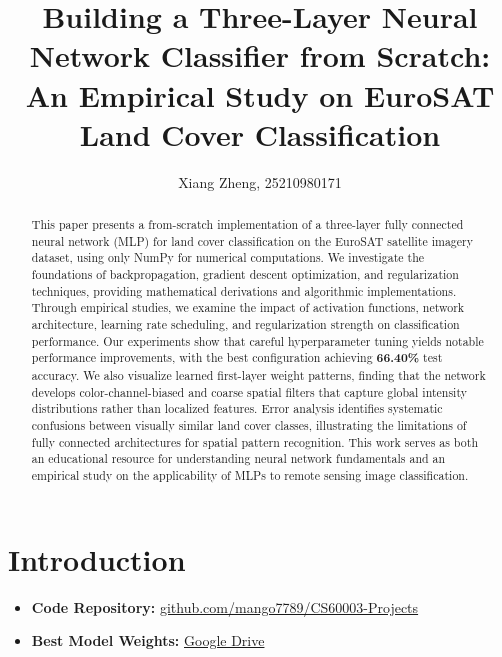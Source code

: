 \documentclass[sigconf,nonacm]{acmart}
\begin{document}
\title{Building a Three-Layer Neural Network Classifier from Scratch: An Empirical Study on EuroSAT Land Cover Classification}

\author{Xiang Zheng, 25210980171}

\renewcommand{\shortauthors}{Xiang Zheng}

\begin{abstract}
This paper presents a from-scratch implementation of a three-layer fully connected neural network (MLP) for land cover classification on the EuroSAT satellite imagery dataset, using only NumPy for numerical computations. We investigate the foundations of backpropagation, gradient descent optimization, and regularization techniques, providing mathematical derivations and algorithmic implementations. Through empirical studies, we examine the impact of activation functions, network architecture, learning rate scheduling, and regularization strength on classification performance. Our experiments show that careful hyperparameter tuning yields notable performance improvements, with the best configuration achieving \textbf{66.40\%} test accuracy. We also visualize learned first-layer weight patterns, finding that the network develops color-channel-biased and coarse spatial filters that capture global intensity distributions rather than localized features. Error analysis identifies systematic confusions between visually similar land cover classes, illustrating the limitations of fully connected architectures for spatial pattern recognition. This work serves as both an educational resource for understanding neural network fundamentals and an empirical study on the applicability of MLPs to remote sensing image classification.
\end{abstract}


\maketitle

\section{Introduction}

\begin{itemize}
    \item \textbf{Code Repository:} \href{https://github.com/mango7789/CS60003-Projects/tree/main/hw1}{github.com/mango7789/CS60003-Projects}
    \item \textbf{Best Model Weights:} \href{https://drive.google.com/file/d/1EZh06x3Ji_XwPE-PbErBwbGDASzOLXKD/view?usp=sharing}{Google Drive}
\end{itemize}
\end{document}
